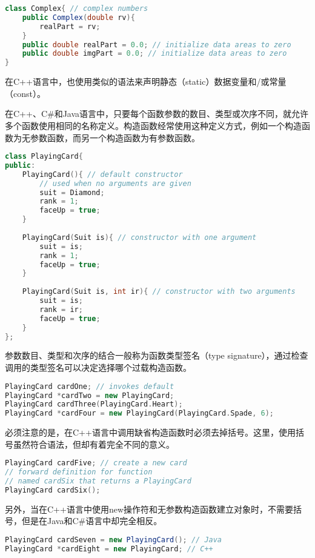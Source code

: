 \begin{lstlisting}[language=Java]
class Complex{ // complex numbers
	public Complex(double rv){
		realPart = rv;
	}
	public double realPart = 0.0; // initialize data areas to zero
	public double imgPart = 0.0; // initialize data areas to zero
}
\end{lstlisting}

在C++语言中，也使用类似的语法来声明静态（static）数据变量和/或常量（const）。

在C++、C\#和Java语言中，只要每个函数参数的数目、类型或次序不同，就允许多个函数使用相同的名称定义。构造函数经常使用这种定义方式，例如一个构造函数为无参数函数，而另一个构造函数为有参数函数。


\begin{lstlisting}[language=C++]
class PlayingCard{
public:
	PlayingCard(){ // default constructor
		// used when no arguments are given
		suit = Diamond;
		rank = 1;
		faceUp = true;
	}
	
	PlayingCard(Suit is){ // constructor with one argument
		suit = is;
		rank = 1;
		faceUp = true;
	}
	
	PlayingCard(Suit is, int ir){ // constructor with two arguments
		suit = is;
		rank = ir;
		faceUp = true;
	}
};
\end{lstlisting}


参数数目、类型和次序的结合一般称为函数类型签名（type signature），通过检查调用的类型签名可以决定选择哪个过载构造函数。


\begin{lstlisting}[language=C++]
PlayingCard cardOne; // invokes default
PlayingCard *cardTwo = new PlayingCard;
PlayingCard cardThree(PlayingCard.Heart);
PlayingCard *cardFour = new PlayingCard(PlayingCard.Spade, 6);
\end{lstlisting}

必须注意的是，在C++语言中调用缺省构造函数时必须去掉括号。这里，使用括号虽然符合语法，但却有着完全不同的意义。



\begin{lstlisting}[language=C++]
PlayingCard cardFive; // create a new card
// forward definition for function 
// named cardSix that returns a PlayingCard
PlayingCard cardSix(); 
\end{lstlisting}

另外，当在C++语言中使用new操作符和无参数构造函数建立对象时，不需要括号，但是在Java和C\#语言中却完全相反。


\begin{lstlisting}[language=Java]
PlayingCard cardSeven = new PlayingCard(); // Java
PlayingCard *cardEight = new PlayingCard; // C++
\end{lstlisting}


